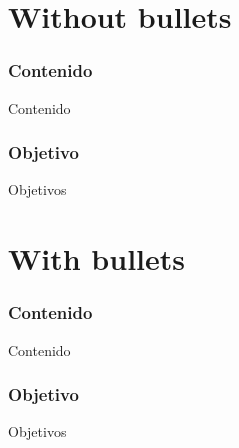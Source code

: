\documentclass{beamer}
\begin{document}
    \section{Without bullets}

        \begin{frame}
            \frametitle{Contenido}
            Contenido
        \end{frame}

        \begin{frame}
          \frametitle{Objetivo}
          Objetivos 
        \end{frame}

    \section{With bullets}

        \begin{frame}
            \frametitle{Contenido}
            Contenido
        \end{frame}

        \begin{frame}
        \frametitle{Objetivo}
         Objetivos 
        \end{frame}
\end{document}
